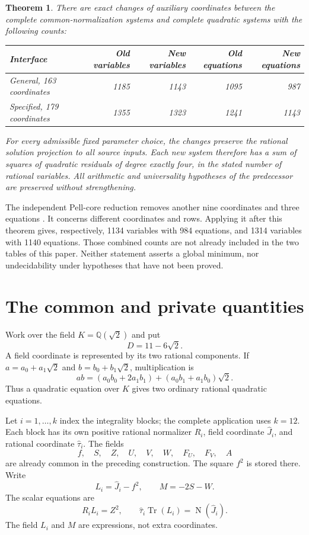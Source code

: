 \documentclass[11pt]{article}
\newtheorem{theorem}{Theorem}
\theoremstyle{remark}\newtheorem{remark}[theorem]{Remark}
\newcommand{\Q}{\mathbb Q}
\newcommand{\Tr}{\operatorname{Tr}}
\newcommand{\Nm}{\operatorname{N}}
\begin{document}
\begin{theorem}\label{thm:main}
There are exact changes of auxiliary coordinates between the complete
common-normalization systems and complete quadratic systems with the
following counts:
\begin{center}
\begin{tabular}{lrrrr}
\toprule
Interface & Old variables & New variables & Old equations & New equations\\
\midrule
General, 163 coordinates &1185&1143&1095&987\\
Specified, 179 coordinates &1355&1323&1241&1143\\
\bottomrule
\end{tabular}
\end{center}
For every admissible fixed parameter choice, the changes preserve the
rational solution projection to all source inputs. Each new system therefore has a sum of squares
of quadratic residuals of degree exactly four, in the stated number of
rational variables. All arithmetic and universality hypotheses of the
predecessor are preserved without strengthening.
\end{theorem}

The independent Pell-core reduction removes another nine coordinates
and three equations \cite{pell}. It concerns different coordinates and
rows. Applying it after this theorem gives, respectively, 1134 variables
with 984 equations, and 1314 variables with 1140 equations. Those
combined counts are not already included in the two tables of this
paper. Neither statement asserts a global minimum, nor undecidability
under hypotheses that have not been proved.

\section{The common and private quantities}

Work over the field \(K=\Q(\sqrt2)\) and put
\[
                       D=11-6\sqrt2.
\]
A field coordinate is represented by its two rational components. If
\(a=a_0+a_1\sqrt2\) and \(b=b_0+b_1\sqrt2\), multiplication is
\[
 ab=(a_0b_0+2a_1b_1)+(a_0b_1+a_1b_0)\sqrt2.
\]
Thus a quadratic equation over \(K\) gives two ordinary rational
quadratic equations.

Let \(i=1,\ldots,k\) index the integrality blocks; the complete
application uses \(k=12\). Each block has its own positive rational
normalizer \(R_i\), field coordinate \(\widehat J_i\), and rational
coordinate \(\widehat\tau_i\). The fields
\[
        f,\quad S,\quad Z,\quad U,\quad V,\quad W,
        \quad F_U,\quad F_V,\quad A
\]
are already common in the preceding construction. The square \(f^2\)
is stored there. Write
\[
                 L_i=\widehat J_i-f^2,
                 \qquad M=-2S-W.
\]
The scalar equations are
\begin{equation}\label{eq:scalar}
       R_iL_i=Z^2,\qquad
       \widehat\tau_i\Tr(L_i)=\Nm(\widehat J_i).
\end{equation}
The field \(L_i\) and \(M\) are expressions, not extra coordinates.
\end{document}
